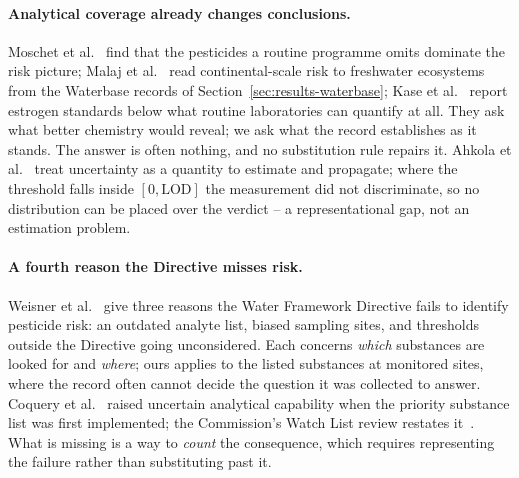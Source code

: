 \paragraph{Analytical coverage already changes conclusions.}
Moschet et al.~\cite{moschet2014screening} find that the pesticides a routine
programme omits dominate the risk picture; Malaj et
al.~\cite{malaj2014continental} read continental-scale risk to freshwater
ecosystems from the Waterbase records of Section~\ref{sec:results-waterbase};
Kase et al.~\cite{kase2018estrogens} report estrogen standards below what
routine laboratories can quantify at all. They ask what better chemistry would
reveal; we ask what the record establishes as it stands. The answer is often
nothing, and no substitution rule repairs it. Ahkola et
al.~\cite{ahkola2024uncertainty} treat uncertainty as a quantity to estimate and
propagate; where the threshold falls inside $[0,\mathrm{LOD}]$ the measurement
did not discriminate, so no distribution can be placed over the verdict -- a
representational gap, not an estimation problem.

\paragraph{A fourth reason the Directive misses risk.}
Weisner et al.~\cite{weisner2022threereasons} give three reasons the Water
Framework Directive fails to identify pesticide risk: an outdated analyte list,
biased sampling sites, and thresholds outside the Directive going unconsidered.
Each concerns \emph{which} substances are looked for and \emph{where}; ours
applies to the listed substances at monitored sites, where the record often
cannot decide the question it was collected to answer. Coquery et
al.~\cite{coquery2005analytical} raised uncertain analytical capability when the
priority substance list was first implemented; the Commission's Watch List
review restates it~\cite{loos2024watchlist}. What is missing is a way to
\emph{count} the consequence, which requires representing the failure rather
than substituting past it.
